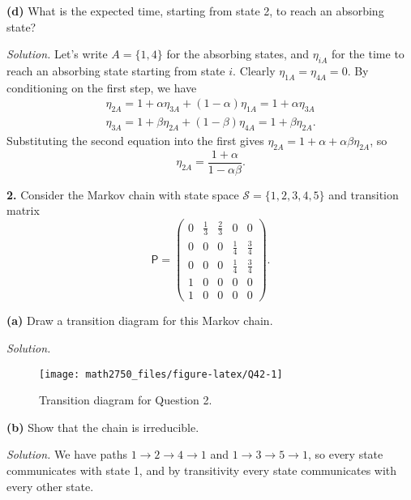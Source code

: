 \documentclass[
  a4paper,
]{article}
\theoremstyle{definition}
\theoremstyle{definition}
\theoremstyle{definition}
\theoremstyle{remark}
\begin{document}
\textbf{(d)} What is the expected time, starting from state 2, to reach an absorbing state?

\begin{myanswers}

\emph{Solution.} Let's write \(A = \{1,4\}\) for the absorbing states, and \(\eta_{iA}\) for the time to reach an absorbing state starting from state \(i\). Clearly \(\eta_{1A} = \eta_{4A} = 0\). By conditioning on the first step, we have
\begin{gather*}
    \eta_{2A} = 1 + \alpha \eta_{3A} + (1-\alpha) \eta_{1A} = 1 + \alpha \eta_{3A}  \\
    \eta_{3A} = 1 + \beta \eta_{2A} + (1-\beta) \eta_{4A} = 1+\beta \eta_{2A} .
    \end{gather*}
Substituting the second equation into the first gives
\(\eta_{2A}= 1 + \alpha + \alpha\beta \eta_{2A}\), so
\[ \eta_{2A} = \frac{1+\alpha}{1-\alpha\beta}  . \]

\end{myanswers}

\textbf{2.}
Consider the Markov chain with state space \(\mathcal S = \{1,2,3,4,5\}\) and transition matrix
\[ \mathsf P = \begin{pmatrix} 0 & \frac13 & \frac23 & 0 & 0 \\
                0 & 0 & 0 & \frac14 & \frac34 \\
                0 & 0 & 0 & \frac14 & \frac34 \\
                1 & 0 & 0 & 0 & 0 \\
                1 & 0 & 0 & 0 & 0 \end{pmatrix} . \]

\textbf{(a)} Draw a transition diagram for this Markov chain.

\begin{myanswers}

\emph{Solution.}

\begin{figure}

{\centering \texttt{[image: math2750\_files/figure-latex/Q42-1]} 

}

\caption{Transition diagram for Question 2.}\label{fig:Q42}
\end{figure}

\end{myanswers}

\textbf{(b)} Show that the chain is irreducible.

\begin{myanswers}

\emph{Solution.} We have paths \(1 \to 2 \to 4 \to 1\) and \(1 \to 3 \to 5 \to 1\), so every state communicates with state 1, and by transitivity every state communicates with every other state.

\end{myanswers}
\end{document}
